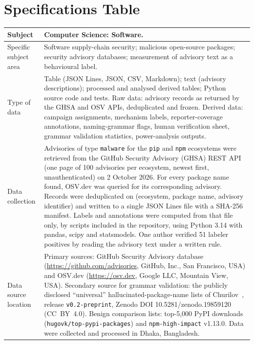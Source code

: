 \documentclass[preprint,12pt]{elsarticle}
\begin{document}
\section*{Specifications Table}

\begin{longtable}{>{\raggedright\arraybackslash}p{} >{\raggedright\arraybackslash}p{}}
\toprule
Subject & Computer Science: Software. \\
\midrule
Specific subject area & Software supply-chain security; malicious open-source packages; security advisory databases; measurement of advisory text as a behavioural label. \\
\midrule
Type of data & Table (JSON Lines, JSON, CSV, Markdown); text (advisory descriptions); processed and analysed derived tables; Python source code and tests. Raw data: advisory records as returned by the GHSA and OSV APIs, deduplicated and frozen. Derived data: campaign assignments, mechanism labels, reporter-coverage annotations, naming-grammar flags, human verification sheet, grammar validation statistics, power-analysis outputs. \\
\midrule
Data collection & Advisories of type \texttt{malware} for the \texttt{pip} and \texttt{npm} ecosystems were retrieved from the GitHub Security Advisory (GHSA) REST API (one page of 100 advisories per ecosystem, newest first, unauthenticated) on 2 October 2026. For every package name found, OSV.dev was queried for its corresponding advisory. Records were deduplicated on (ecosystem, package name, advisory identifier) and written to a single JSON Lines file with a SHA-256 manifest. Labels and annotations were computed from that file only, by scripts included in the repository, using Python 3.14 with pandas, scipy and statsmodels. One author verified 51 labeler positives by reading the advisory text under a written rule. \\
\midrule
Data source location & Primary sources: GitHub Security Advisory database (\url{https://github.com/advisories}, GitHub, Inc., San Francisco, USA) and OSV.dev (\url{https://osv.dev}, Google LLC, Mountain View, USA). Secondary source for grammar validation: the publicly disclosed ``universal'' hallucinated-package-name lists of Churilov~\cite{churilov2026}, release \texttt{v0.2-preprint}, Zenodo DOI 10.5281/zenodo.19859120 (CC~BY~4.0). Benign comparison lists: top-5,000 PyPI downloads (\texttt{hugovk/top-pypi-packages}) and \texttt{npm-high-impact} v1.13.0. Data were collected and processed in Dhaka, Bangladesh. \\

\end{longtable}
\end{document}
